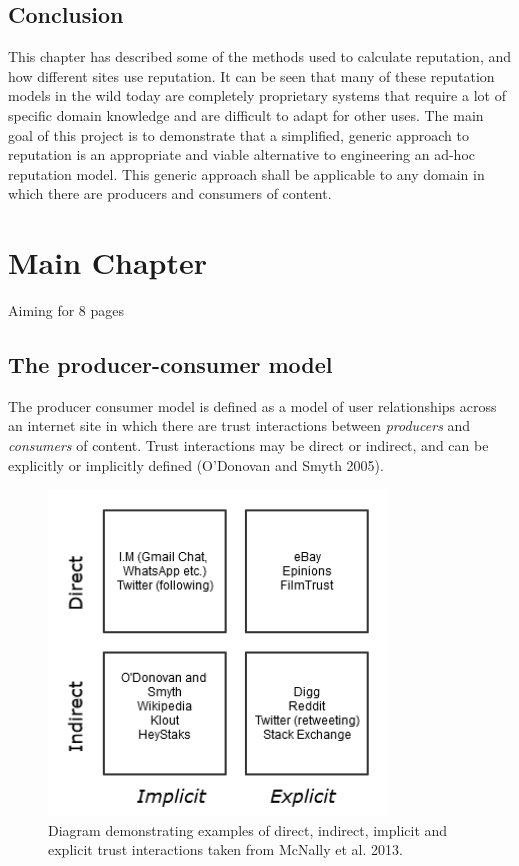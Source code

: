 \documentclass[]{final_report}
\begin{document}
\section{Conclusion}

This chapter has described some of the methods used to calculate reputation, and how different sites use reputation. It can be seen that many of these reputation models in the wild today are completely proprietary systems that require a lot of specific domain knowledge and are difficult to adapt for other uses. The main goal of this project is to demonstrate that a simplified, generic approach to reputation is an appropriate and viable alternative to engineering an ad-hoc reputation model. This generic approach shall be applicable to any domain in which there are producers and consumers of content.

\chapter{Main Chapter}

Aiming for 8 pages

\section{The producer-consumer model}

The producer consumer model is defined as a model of user relationships across an internet site in which there are trust interactions between \textsl{producers} and \textsl{consumers} of content. Trust interactions may be direct or indirect, and can be explicitly or implicitly defined (O'Donovan and Smyth 2005).

\begin{figure}[ht!]
\centering
\includegraphics[width=90mm]{chap3/trusttypes.png}
\caption{Diagram demonstrating examples of direct, indirect, implicit and explicit trust interactions taken from McNally et al. 2013.}
\end{figure}\label{gra:trusttypes}
\end{document}
